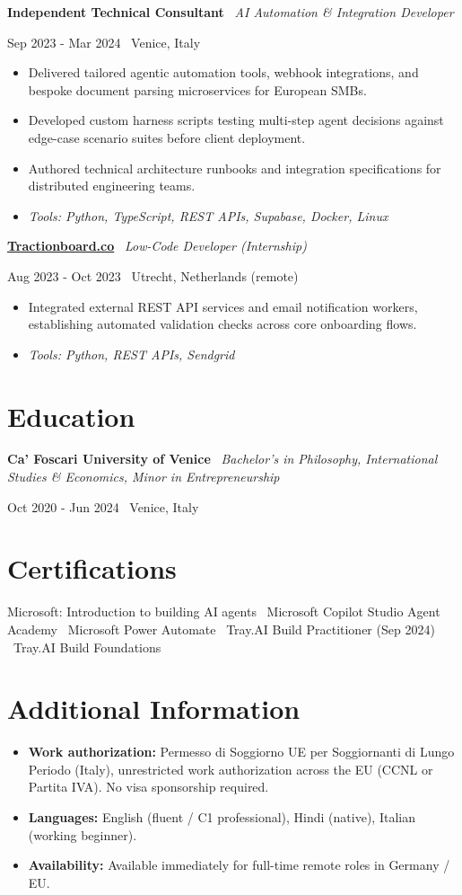 \documentclass[a4paper,10pt]{article}
\newcommand{\role}[4]{%
  \vspace{2pt}\noindent
  \begin{minipage}[t]{0.70\textwidth}\raggedright\textbf{#1} \textbullet\ \textit{#3}\end{minipage}%
  \hfill
  \begin{minipage}[t]{0.28\textwidth}\raggedleft\footnotesize\color{gray}#2 \textbullet\ #4\end{minipage}%
  \vspace{1pt}%
}
\begin{document}
\role{Independent Technical Consultant}{Sep 2023 - Mar 2024}{AI Automation \& Integration Developer}{Venice, Italy}
\begin{itemize}
  \item Delivered tailored agentic automation tools, webhook integrations, and bespoke document parsing microservices for European SMBs.
  \item Developed custom harness scripts testing multi-step agent decisions against edge-case scenario suites before client deployment.
  \item Authored technical architecture runbooks and integration specifications for distributed engineering teams.
  \item \textit{Tools: Python, TypeScript, REST APIs, Supabase, Docker, Linux}
\end{itemize}

\role{\href{https://tractionboard.co}{Tractionboard.co}}{Aug 2023 - Oct 2023}{Low-Code Developer (Internship)}{Utrecht, Netherlands (remote)}
\begin{itemize}
  \item Integrated external REST API services and email notification workers, establishing automated validation checks across core onboarding flows.
  \item \textit{Tools: Python, REST APIs, Sendgrid}
\end{itemize}

\section{Education}
\role{Ca' Foscari University of Venice}{Oct 2020 - Jun 2024}{Bachelor's in Philosophy, International Studies \& Economics, Minor in Entrepreneurship}{Venice, Italy}

\section{Certifications}
Microsoft: Introduction to building AI agents \textbullet\ Microsoft Copilot Studio Agent Academy \textbullet\ Microsoft Power Automate \textbullet\ Tray.AI Build Practitioner (Sep 2024) \textbullet\ Tray.AI Build Foundations

\section{Additional Information}
\begin{itemize}
  \item \textbf{Work authorization:} Permesso di Soggiorno UE per Soggiornanti di Lungo Periodo (Italy), unrestricted work authorization across the EU (CCNL or Partita IVA). No visa sponsorship required.
  \item \textbf{Languages:} English (fluent / C1 professional), Hindi (native), Italian (working beginner).
  \item \textbf{Availability:} Available immediately for full-time remote roles in Germany / EU.
\end{itemize}
\end{document}
